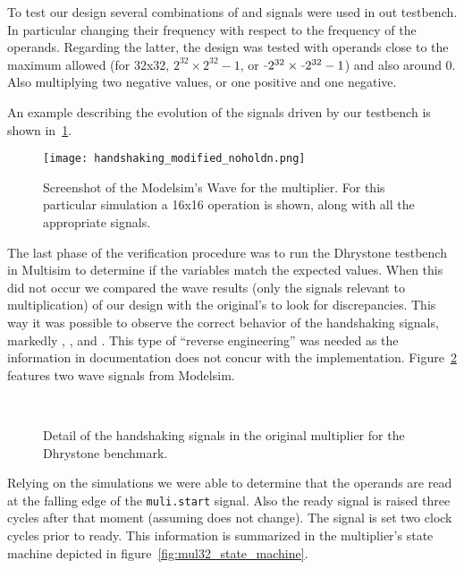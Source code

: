 To test our design several combinations of \holdn and \start signals were used in out testbench. In particular changing their frequency with respect to the frequency of the operands.
Regarding the latter, the design was tested with operands close to the maximum allowed (\eg for 32x32, $2^{32} \times 2^{32}-1$, or $\unaryminus 2^{32} \times \unaryminus 2^{32}-1$) and also around 0. Also multiplying two negative values, or one positive and one negative.

An example describing the evolution of the signals driven by our testbench is shown in~\ref{fig:mul32_wave}.

\begin{figure}[H]
\centering
\texttt{[image: handshaking\_modified\_noholdn.png]}
\caption{Screenshot of the Modelsim's Wave for the multiplier. For this particular simulation a 16x16 operation is shown, along with all the appropriate signals.}
\label{fig:mul32_wave}
\end{figure}

The last phase of the verification procedure was to run the Dhrystone testbench in Multisim to determine if the variables match the expected values. When this did not occur we compared the wave results (only the signals relevant to multiplication) of our design with the original's to look for discrepancies. This way it was possible to observe the correct behavior of the handshaking signals, markedly \start, \holdn, \ready and \nready. This type of ``reverse engineering'' was needed as the information in documentation does not concur with the implementation. Figure~\ref{fig:handshake} features two wave signals from Modelsim.

\begin{figure}[H]
\centering
{}\\
\quad
\caption{Detail of the handshaking signals in the original multiplier for the Dhrystone benchmark.}
\label{fig:handshake}
\end{figure}

Relying on the simulations we were able to determine that the operands are read at the falling edge of the \texttt{muli.start} signal. Also the ready signal is raised three cycles after that moment (assuming \holdn does not change). The \nready signal is set two clock cycles prior to ready.
This information is summarized in the multiplier's state machine depicted in figure~\ref{fig:mul32_state_machine}.

